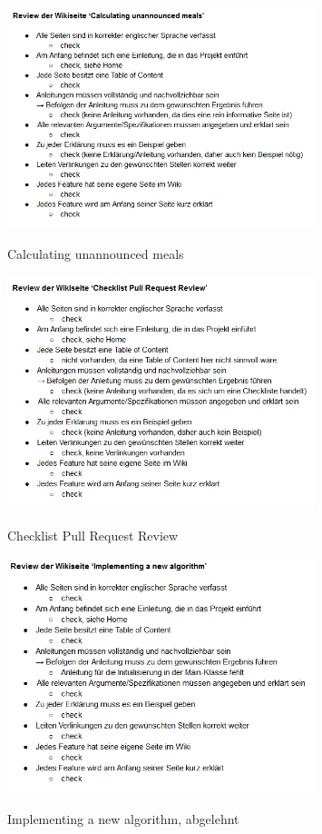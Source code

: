 \documentclass[accentcolor=tud0b,12pt,paper=a4]{tudreport}
\begin{document}
\begin{figure}[h]
\centering
\caption{Calculating unannounced meals}
\includegraphics[width=0.8\textwidth]{wiki5}
\label{wiki5}
\end{figure}

\begin{figure}[h]
\centering
\caption{Checklist Pull Request Review}
\includegraphics[width=0.8\textwidth]{wiki6}
\label{wiki6}
\end{figure}

\begin{figure}[h]
\centering
\caption{Implementing a new algorithm, abgelehnt}
\includegraphics[width=0.8\textwidth]{wiki7}
\label{wiki7}
\end{figure}
\end{document}
